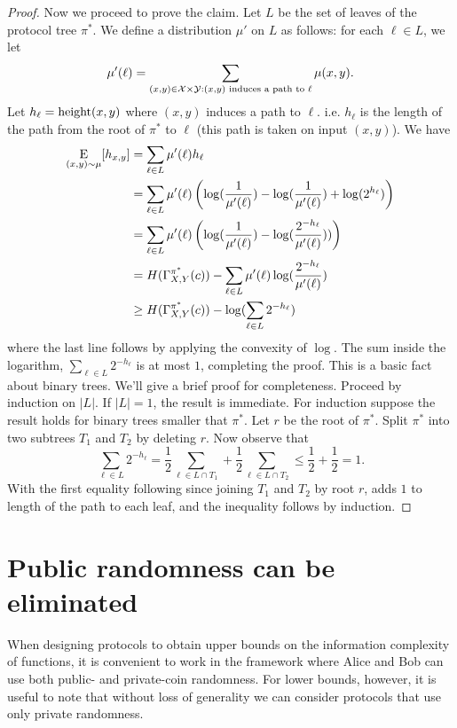\begin{proof}
Now we proceed to prove the claim. Let $L$ be the set of leaves of the protocol tree $\pi^*$. We define a distribution $\mu'$ on $L$ as follows: for each $\ell \in L$, we let
 $$\mu'(\ell) = \sum_{(x,y) \in \mathcal{X}\times\mathcal{Y} : (x,y)\text{ induces a path to } \ell} \mu(x,y).$$ 
 Let $h_\ell = \operatorname{height}(x,y)$ where $(x,y)$ induces a path to $\ell$. i.e. $h_\ell$ is the length of the path from the root of $\pi^*$ to $\ell$ (this path is taken on input $(x,y)$). We have
\begin{align*}
\operatorname*{\mathrm{E}}_{(x,y)\sim \mu}[h_{x,y}] &=\sum_{\ell \in L} \mu'(\ell) h_\ell \\
&=\sum_{\ell \in L} \mu'(\ell)\left(\log(\frac{1}{\mu'(\ell)})-\log(\frac{1}{\mu'(\ell)}) +\log(2^{h_\ell})\right)\\
&=\sum_{\ell\in L} \mu'(\ell)\left(\log(\frac{1}{\mu'(\ell)})-\log(\frac{2^{-h_\ell}}{\mu'(\ell)}))\right) \\
&=H(\Gamma^{\pi^*}_{X,Y}(c)) - \sum_{\ell\in L}\mu'(\ell)\log(\frac{2^{-h_\ell}}{\mu'(\ell)}) \\
&\geq H(\Gamma^{\pi^*}_{X,Y}(c)) - \log(\sum_{\ell\in L} 2^{-h_\ell})
\end{align*}
where the last line follows by applying the convexity of $\log$. The sum inside the logarithm, $\sum_{\ell \in L} 2^{-h_\ell}$ is at most $1$, completing the proof. This is a basic fact about binary trees. We'll give a brief proof for completeness.
Proceed by induction on $|L|$. If $|L| = 1$, the result is immediate. For induction suppose the result holds for binary trees smaller that $\pi^*$. Let $r$ be the root of $\pi^*$. Split $\pi^*$ into two subtrees $T_1$ and $T_2$ by deleting $r$. Now observe that
$$\sum_{\ell \in L} 2^{-h_\ell} = \frac{1}{2}\sum_{\ell \in L \cap T_1} + \frac{1}{2}\sum_{\ell \in L \cap T_2} \leq \frac{1}{2}+\frac{1}{2} = 1.$$
With the first equality following since joining $T_1$ and $T_2$ by root $r$, adds $1$ to length of the path to each leaf, and the inequality follows by induction.
\end{proof}


\newpage 
\section{Public randomness can be eliminated}

When designing protocols to obtain upper bounds on the information complexity of functions, it is convenient to work in the framework where Alice and Bob can use both public- and private-coin randomness. For lower bounds, however, it is useful to note that without loss of generality we can consider protocols that use only private randomness.

